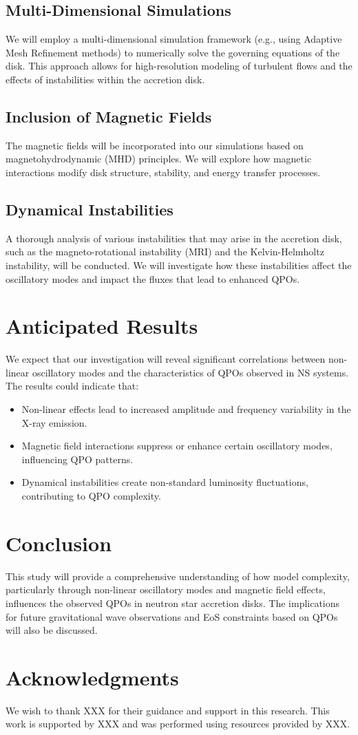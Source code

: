 \documentclass[twocolumn]{aastex631}
\begin{document}
\subsection{Multi-Dimensional Simulations}
We will employ a multi-dimensional simulation framework (e.g., using Adaptive Mesh Refinement methods) to numerically solve the governing equations of the disk. This approach allows for high-resolution modeling of turbulent flows and the effects of instabilities within the accretion disk.

\subsection{Inclusion of Magnetic Fields}
The magnetic fields will be incorporated into our simulations based on magnetohydrodynamic (MHD) principles. We will explore how magnetic interactions modify disk structure, stability, and energy transfer processes.

\subsection{Dynamical Instabilities}
A thorough analysis of various instabilities that may arise in the accretion disk, such as the magneto-rotational instability (MRI) and the Kelvin-Helmholtz instability, will be conducted. We will investigate how these instabilities affect the oscillatory modes and impact the fluxes that lead to enhanced QPOs.

\section{Anticipated Results}
We expect that our investigation will reveal significant correlations between non-linear oscillatory modes and the characteristics of QPOs observed in NS systems. The results could indicate that:
\begin{itemize}
    \item Non-linear effects lead to increased amplitude and frequency variability in the X-ray emission.
    \item Magnetic field interactions suppress or enhance certain oscillatory modes, influencing QPO patterns.
    \item Dynamical instabilities create non-standard luminosity fluctuations, contributing to QPO complexity.
\end{itemize}

\section{Conclusion}
This study will provide a comprehensive understanding of how model complexity, particularly through non-linear oscillatory modes and magnetic field effects, influences the observed QPOs in neutron star accretion disks. The implications for future gravitational wave observations and EoS constraints based on QPOs will also be discussed.

\section*{Acknowledgments}
We wish to thank XXX for their guidance and support in this research. This work is supported by XXX and was performed using resources provided by XXX.

\bigskip

\end{document}
